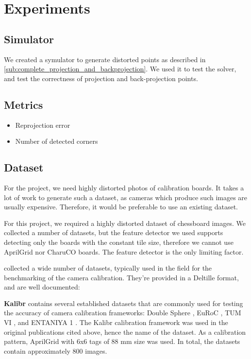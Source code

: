 \chapter{Experiments}\label{cha:experiments}

\section{Simulator}\label{sec:simulator}

We created a symulator to generate distorted points as described in
\cref{sub:complete_projection_and_backprojection}. We used it to test the
solver, and test the correctness of projection and back-projection points.

\section{Metrics}\label{sec:metrics}

\begin{itemize}
	\item Reprojection error
	\item Number of detected corners
\end{itemize}

\section{Dataset}\label{sec:dataset}

For the project, we need highly distorted photos of calibration boards. It takes
a lot of work to generate such a dataset, as cameras which produce such images are
usually expensive. Therefore, it would be preferable to use an existing dataset.

For this project, we required a highly distorted dataset of chessboard images.
We collected a number of datasets, but the feature detector we used supports
detecting only the boards with the constant tile size, therefore we cannot use
AprilGrid nor CharuCO boards. The feature detector is the only limiting factor.

\textcite{lochmanBabelCalibUniversalApproach2021} collected a wide number of
datasets, typically used in the field for the benchmarking of the camera
calibration. They're provided in a Deltille \cite{DeltilleDetector2023} format,
and are well documented:

\textbf{Kalibr} \citep{mayeSelfsupervisedCalibrationRobotic2013} contains several established datasets that are commonly used for testing
the accuracy of camera calibration frameworks: Double Sphere
\cite{usenkoDoubleSphereCamera2018}, EuRoC \cite{burriEuRoCMicroAerial2016}, TUM
VI \cite{schubertTUMVIBenchmark2018}, and ENTANIYA 1
\cite{Calibration250degFisheye}.
The Kalibr calibration framework was used in the
original publications cited above, hence the name of the dataset.
As a calibration pattern, AprilGrid with 6x6 tags of 88 mm size was used.
In total, the datasets contain approximately 800 images.

